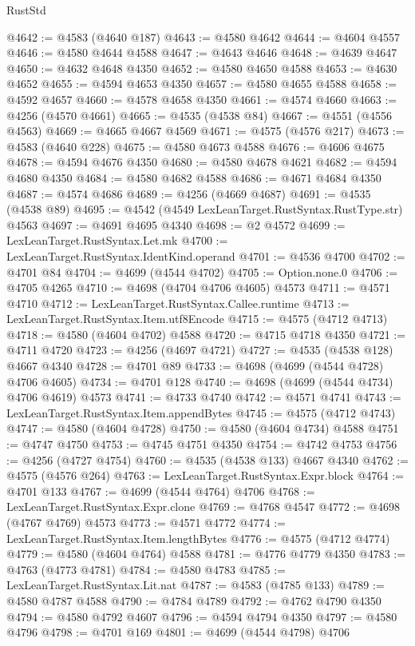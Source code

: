 \begin{lexlean}{RustStd}
\begin{coremodule}
@4642 := @4583 (@4640 @187)
@4643 := @4580 @4642
@4644 := @4604 @4557
@4646 := @4580 @4644 @4588
@4647 := @4643 @4646
@4648 := @4639 @4647
@4650 := @4632 @4648 @4350
@4652 := @4580 @4650 @4588
@4653 := @4630 @4652
@4655 := @4594 @4653 @4350
@4657 := @4580 @4655 @4588
@4658 := @4592 @4657
@4660 := @4578 @4658 @4350
@4661 := @4574 @4660
@4663 := @4256 (@4570 @4661)
@4665 := @4535 (@4538 @84)
@4667 := @4551 (@4556 @4563)
@4669 := @4665 @4667 @4569
@4671 := @4575 (@4576 @217)
@4673 := @4583 (@4640 @228)
@4675 := @4580 @4673 @4588
@4676 := @4606 @4675
@4678 := @4594 @4676 @4350
@4680 := @4580 @4678 @4621
@4682 := @4594 @4680 @4350
@4684 := @4580 @4682 @4588
@4686 := @4671 @4684 @4350
@4687 := @4574 @4686
@4689 := @4256 (@4669 @4687)
@4691 := @4535 (@4538 @89)
@4695 := @4542 (@4549 LexLeanTarget.RustSyntax.RustType.str) @4563
@4697 := @4691 @4695 @4340
@4698 := @2 @4572
@4699 := LexLeanTarget.RustSyntax.Let.mk
@4700 := LexLeanTarget.RustSyntax.IdentKind.operand
@4701 := @4536 @4700
@4702 := @4701 @84
@4704 := @4699 (@4544 @4702)
@4705 := Option.none.{0}
@4706 := @4705 @4265
@4710 := @4698 (@4704 @4706 @4605) @4573
@4711 := @4571 @4710
@4712 := LexLeanTarget.RustSyntax.Callee.runtime
@4713 := LexLeanTarget.RustSyntax.Item.utf8Encode
@4715 := @4575 (@4712 @4713)
@4718 := @4580 (@4604 @4702) @4588
@4720 := @4715 @4718 @4350
@4721 := @4711 @4720
@4723 := @4256 (@4697 @4721)
@4727 := @4535 (@4538 @128) @4667 @4340
@4728 := @4701 @89
@4733 := @4698 (@4699 (@4544 @4728) @4706 @4605)
@4734 := @4701 @128
@4740 := @4698 (@4699 (@4544 @4734) @4706 @4619) @4573
@4741 := @4733 @4740
@4742 := @4571 @4741
@4743 := LexLeanTarget.RustSyntax.Item.appendBytes
@4745 := @4575 (@4712 @4743)
@4747 := @4580 (@4604 @4728)
@4750 := @4580 (@4604 @4734) @4588
@4751 := @4747 @4750
@4753 := @4745 @4751 @4350
@4754 := @4742 @4753
@4756 := @4256 (@4727 @4754)
@4760 := @4535 (@4538 @133) @4667 @4340
@4762 := @4575 (@4576 @264)
@4763 := LexLeanTarget.RustSyntax.Expr.block
@4764 := @4701 @133
@4767 := @4699 (@4544 @4764) @4706
@4768 := LexLeanTarget.RustSyntax.Expr.clone
@4769 := @4768 @4547
@4772 := @4698 (@4767 @4769) @4573
@4773 := @4571 @4772
@4774 := LexLeanTarget.RustSyntax.Item.lengthBytes
@4776 := @4575 (@4712 @4774)
@4779 := @4580 (@4604 @4764) @4588
@4781 := @4776 @4779 @4350
@4783 := @4763 (@4773 @4781)
@4784 := @4580 @4783
@4785 := LexLeanTarget.RustSyntax.Lit.nat
@4787 := @4583 (@4785 @133)
@4789 := @4580 @4787 @4588
@4790 := @4784 @4789
@4792 := @4762 @4790 @4350
@4794 := @4580 @4792 @4607
@4796 := @4594 @4794 @4350
@4797 := @4580 @4796
@4798 := @4701 @169
@4801 := @4699 (@4544 @4798) @4706

\end{coremodule}
\end{lexlean}

